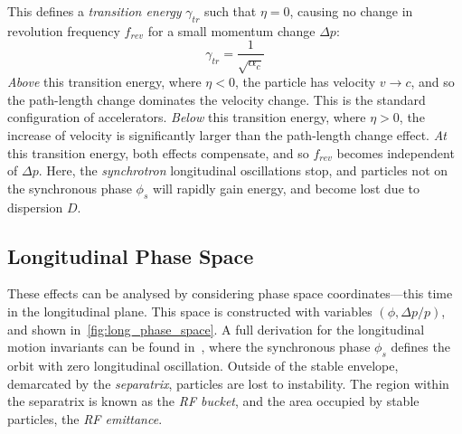 \documentclass[11pt]{report}
\begin{document}
This defines a \textit{transition energy} $\gamma_{tr}$ such that $\eta=0$, causing no change in revolution frequency $f_{rev}$ for a small momentum change $\Delta p$:
\begin{equation}
  \gamma_{tr}=\frac 1{\sqrt{\alpha_c}}
\end{equation}
\textit{Above} this transition energy, where $\eta<0$, the particle has velocity $v\rightarrow c$, and so the path-length change dominates the velocity change. This is the standard configuration of accelerators.
\textit{Below} this transition energy, where $\eta >0$, the increase of velocity is significantly larger than the path-length change effect.
\textit{At} this transition energy, both effects compensate, and so $f_{rev}$ becomes independent of $\Delta p$. Here, the \textit{synchrotron} longitudinal oscillations stop, and particles not on the synchronous phase $\phi_s$ will rapidly gain energy, and become lost due to dispersion $D$.


\subsection{Longitudinal Phase Space}\label{sec:long_phase_space}

These effects can be analysed by considering phase space coordinates---this time in the longitudinal plane. This space is constructed with variables $(\phi , \Delta p/p)$, and shown in~\autoref{fig:long_phase_space}. A full derivation for the longitudinal motion invariants can be found in~\cite{lbd:tecker}, where the synchronous phase $\phi_s$ defines the orbit with zero longitudinal oscillation. Outside of the stable envelope, demarcated by the \textit{separatrix}, particles are lost to instability. The region within the separatrix is known as the \textit{RF bucket}, and the area occupied by stable particles, the \textit{RF emittance}.
\end{document}

